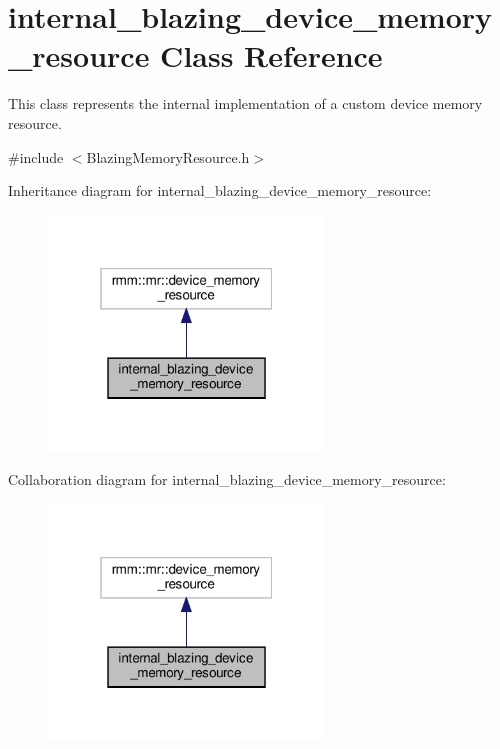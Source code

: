 \hypertarget{classinternal__blazing__device__memory__resource}{}\section{internal\+\_\+blazing\+\_\+device\+\_\+memory\+\_\+resource Class Reference}
\label{classinternal__blazing__device__memory__resource}


This class represents the internal implementation of a custom device memory resource.  




{\ttfamily \#include $<$Blazing\+Memory\+Resource.\+h$>$}



Inheritance diagram for internal\+\_\+blazing\+\_\+device\+\_\+memory\+\_\+resource\+:\nopagebreak
\begin{figure}[H]
\begin{center}
\leavevmode
\includegraphics[width=208pt]{classinternal__blazing__device__memory__resource__inherit__graph}
\end{center}
\end{figure}


Collaboration diagram for internal\+\_\+blazing\+\_\+device\+\_\+memory\+\_\+resource\+:\nopagebreak
\begin{figure}[H]
\begin{center}
\leavevmode
\includegraphics[width=208pt]{classinternal__blazing__device__memory__resource__coll__graph}
\end{center}
\end{figure}
